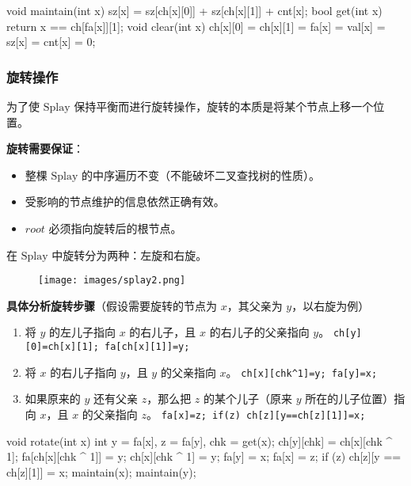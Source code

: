 \begin{cppcode}
void maintain(int x) { sz[x] = sz[ch[x][0]] + sz[ch[x][1]] + cnt[x]; }
bool get(int x) { return x == ch[fa[x]][1]; }
void clear(int x) { ch[x][0] = ch[x][1] = fa[x] = val[x] = sz[x] = cnt[x] = 0; }
\end{cppcode}

\subsubsection{旋转操作}

为了使 $\text{Splay}$ 保持平衡而进行旋转操作，旋转的本质是将某个节点上移一个位置。

\textbf{旋转需要保证}：

\begin{itemize}
\item 整棵 $\text{Splay}$ 的中序遍历不变（不能破坏二叉查找树的性质）。
\item 受影响的节点维护的信息依然正确有效。
\item $root$ 必须指向旋转后的根节点。
\end{itemize}

在 $\text{Splay}$ 中旋转分为两种：左旋和右旋。

\begin{figure}[h]
\centering
\texttt{[image: images/splay2.png]} 

\end{figure}

\textbf{具体分析旋转步骤}（假设需要旋转的节点为 $x$，其父亲为 $y$，以右旋为例）

\begin{enumerate}
\item 将 $y$ 的左儿子指向 $x$ 的右儿子，且 $x$ 的右儿子的父亲指向 $y$。
\texttt{ch[y][0]=ch[x][1]; fa[ch[x][1]]=y;}
\item 将 $x$ 的右儿子指向 $y$，且 $y$ 的父亲指向 $x$。
\texttt{ch[x][chk^1]=y; fa[y]=x;}
\item 如果原来的 $y$ 还有父亲 $z$，那么把 $z$ 的某个儿子（原来 $y$ 所在的儿子位置）指向 $x$，且 $x$ 的父亲指向 $z$。
\texttt{fa[x]=z; if(z) ch[z][y==ch[z][1]]=x;}
\end{enumerate}

\begin{cppcode}
void rotate(int x) {
  int y = fa[x], z = fa[y], chk = get(x);
  ch[y][chk] = ch[x][chk ^ 1];
  fa[ch[x][chk ^ 1]] = y;
  ch[x][chk ^ 1] = y;
  fa[y] = x;
  fa[x] = z;
  if (z) ch[z][y == ch[z][1]] = x;
  maintain(x);
  maintain(y);
}
\end{cppcode}

